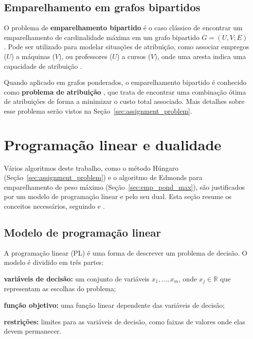 \subsection{Emparelhamento em grafos bipartidos}

O problema de \textbf{emparelhamento bipartido} é o caso clássico de encontrar um emparelhamento de cardinalidade máxima em um grafo 
bipartido $G=(U,V;E)$ \cite{kleinberg}. Pode ser utilizado para modelar situações de atribuição, como associar empregos ($U$) a máquinas ($V$), ou professores ($U$) a cursos ($V$), onde uma aresta indica uma capacidade de atribuição \cite{kleinberg}. 

Quando aplicado em grafos ponderados, o emparelhamento bipartido é conhecido como \textbf{problema de atribuição} \cite{lawler}, que trata de encontrar uma combinação ótima de atribuições de forma a minimizar o custo total associado. Mais detalhes sobre esse problema serão vistos na Seção~\ref{sec:assignment_problem}.

\section{Programação linear e dualidade}
\label{sec:pl}

Vários algoritmos deste trabalho, como o método Húngaro (Seção~\ref{sec:assignment_problem}) e o algoritmo de Edmonds para emparelhamento de peso máximo (Seção~\ref{sec:emp_pond_max}), são justificados por um modelo de programação linear e pelo seu dual. Esta seção resume os conceitos necessários, seguindo  e .

\subsection{Modelo de programação linear}

A programação linear (PL) é uma forma de descrever um problema de decisão. O modelo é dividido em três partes:

\begin{alineas}
    \item \textbf{variáveis de decisão:} um conjunto de variáveis $x_1, \dots, x_m$, onde $x_j \in \mathbb{R}$ que representam as escolhas do problema;
    \item \textbf{função objetivo:} uma função linear dependente das variáveis de decisão;
    \item \textbf{restrições:} limites para as variáveis de decisão, como faixas de valores onde elas devem permanecer.
\end{alineas}


